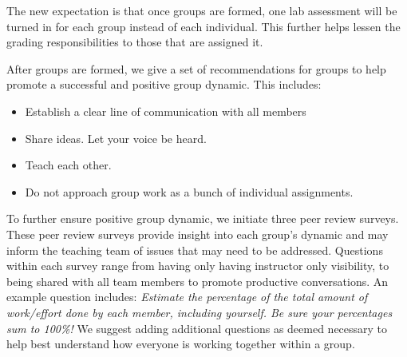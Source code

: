 \documentclass[
  12pt]{article}
\newenvironment{Shaded}{\begin{snugshade}}{\end{snugshade}}
\newcommand{\AttributeTok}[1]{\textcolor[rgb]{0.40,0.45,0.13}{#1}}
\newcommand{\CommentTok}[1]{\textcolor[rgb]{0.37,0.37,0.37}{#1}}
\newcommand{\FunctionTok}[1]{\textcolor[rgb]{0.28,0.35,0.67}{#1}}
\newcommand{\NormalTok}[1]{\textcolor[rgb]{0.00,0.23,0.31}{#1}}
\newcommand{\OtherTok}[1]{\textcolor[rgb]{0.00,0.23,0.31}{#1}}
\newcommand{\SpecialCharTok}[1]{\textcolor[rgb]{0.37,0.37,0.37}{#1}}
\newcommand{\StringTok}[1]{\textcolor[rgb]{0.13,0.47,0.30}{#1}}
\begin{document}
\begin{Shaded}
\end{Shaded}

The new expectation is that once groups are formed, one lab assessment
will be turned in for each group instead of each individual. This
further helps lessen the grading responsibilities to those that are
assigned it.

After groups are formed, we give a set of recommendations for groups to
help promote a successful and positive group dynamic. This includes:

\begin{itemize}
\item
  Establish a clear line of communication with all members
\item
  Share ideas. Let your voice be heard.
\item
  Teach each other.
\item
  Do not approach group work as a bunch of individual assignments.
\end{itemize}

To further ensure positive group dynamic, we initiate three peer review
surveys. These peer review surveys provide insight into each group's
dynamic and may inform the teaching team of issues that may need to be
addressed. Questions within each survey range from having only having
instructor only visibility, to being shared with all team members to
promote productive conversations. An example question includes:
\emph{Estimate the percentage of the total amount of work/effort done by
each member, including yourself. Be sure your percentages sum to 100\%!}
We suggest adding additional questions as deemed necessary to help best
understand how everyone is working together within a group.
\end{document}
